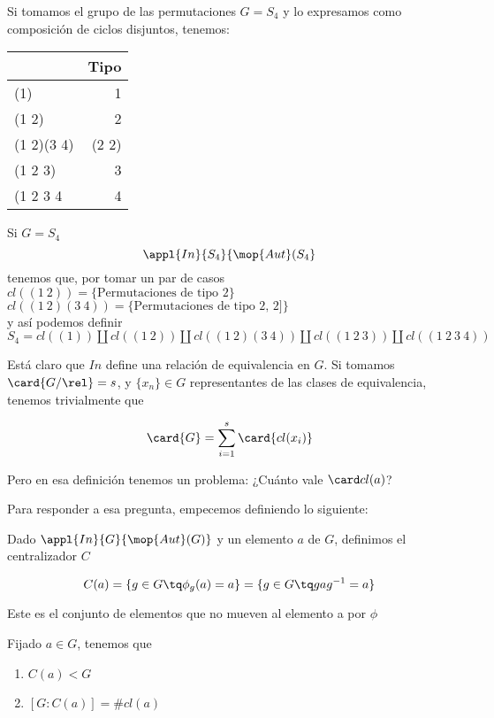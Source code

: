 \documentclass[nochap]{apuntes}
\begin{document}
\begin{example}
Si tomamos el grupo de las permutaciones $G=S_4$ y lo expresamos como composición de ciclos disjuntos, tenemos:\\
\begin{center}
\begin{tabular}{|l|r|}
\hline
& Tipo\\
\hline
(1) & 1\\
(1 2) & 2\\
(1 2)(3 4) & (2 2)\\
(1 2 3) & 3\\
(1 2 3 4 & 4\\
\hline
\end{tabular}
\end{center}
Si $G=S_4$\\
$$\appl{In}{S_4}{\mop{Aut}(S_4}$$
tenemos que, por tomar un par de casos
$cl((1\ 2)) = \{ \text{Permutaciones de tipo 2} \}$\\
$cl((1\ 2)(3\ 4)) = \{ \text{Permutaciones de tipo 2, 2]} \}$\\
y así podemos definir\\
$S_4 = cl((1)) \coprod cl((1\ 2)) \coprod cl((1\ 2)(3\ 4)) \coprod cl((1\ 2\ 3)) \coprod cl((1\ 2\ 3\ 4))$
\end{example}

Está claro que $In$ define una relación de equivalencia en $G$. Si tomamos $\card{G/\rel} = s$, y $\{x_n\}∈G$ representantes de las clases de equivalencia, tenemos trivialmente que

\[ \card{G} = \sum_{i=1}^{s} \card{cl(x_i)} \]

Pero en esa definición tenemos un problema: ¿Cuánto vale $\card cl(a)$?

Para responder a esa pregunta, empecemos definiendo lo siguiente:

\begin{defn}[Centralizador] Dado $\appl{In}{G}{\mop{Aut}(G)}$ y un elemento $a$ de $G$, definimos el centralizador $C$

\[ C(a) = \{ g\in G \tq \phi _g(a) = a\} = \{ g\in G \tq gag^{-1} = a\} \]

Este es el conjunto de elementos que no mueven al elemento a por $\phi$
\end{defn}

\begin{theorem}\label{thmConj1}
Fijado $a\in G$, tenemos que
\begin{enumerate}
\item $C(a) < G$
\item $[ G:C(a) ] = \# cl(a) $
\end{enumerate}
\end{theorem}
\end{document}
